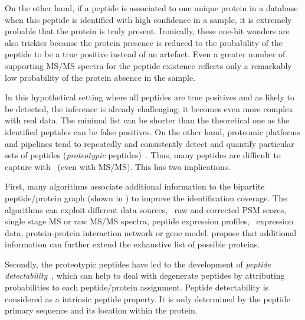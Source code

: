 On the other hand,
if a peptide is associated to one unique protein in a database
when this peptide is identified with high confidence in a sample,
it is extremely probable that the protein is truly present.
Ironically, these one-hit wonders are also trickier because
the protein presence is reduced to
the probability of the peptide to be a true positive instead of an artefact.
Even a greater number of supporting \gls{MS/MS} spectra for the peptide existence
reflects only a remarkably low probability of the protein absence in the sample.

In this hypothetical setting
where all peptides are true positives and as likely to be detected,
the inference is already challenging;
it becomes even more complex with real data.
The minimal list can be shorter than the theoretical one as
the identified peptides can be false positives.
On the other hand,
proteomic platforms and pipelines tend to
repeatedly and consistently detect and quantify particular sets of peptides
(\emph{proteotypic} peptides)~.
Thus, many peptides are difficult to capture with \ms\ (even with \gls{MS/MS}).
This has two implications.

First, many algorithms associate additional information
to the bipartite peptide/protein graph (shown in )
to improve the identification coverage.
The algorithms can exploit different data sources, \eg\ raw and corrected \gls{PSM} scores,
single stage \gls{MS} or raw \gls{MS/MS} spectra,
peptide expression profiles, \mRNA\ expression data,
protein-protein interaction network or gene model.
\citet{Huang2012-nr} propose that additional information can further
extend the exhaustive list of possible proteins.

Secondly, the proteotypic peptides have led to
the development of \emph{peptide detectability}~,
which can help to deal with degenerate peptides
by attributing probabilities to each peptide/protein assignment.
Peptide detectability is considered as a intrinsic peptide property.
It is only determined by the peptide primary sequence and
its location within the protein.

